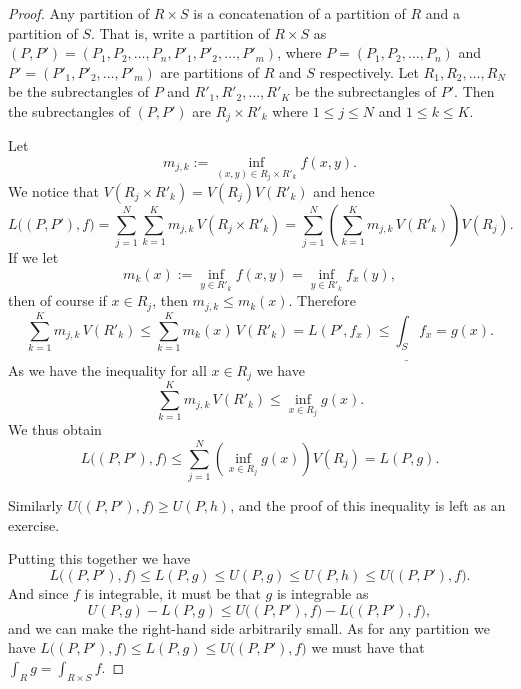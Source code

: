 \begin{proof}
Any partition of $R \times S$ is a concatenation of a partition of $R$ and a
partition of $S$.  That is, write a partition of $R \times S$
as $(P,P') = (P_1,P_2,\ldots,P_n,P'_1,P'_2,\ldots,P'_m)$,
where
$P = (P_1,P_2,\ldots,P_n)$ and
$P' = (P'_1,P'_2,\ldots,P'_m)$ are partitions of $R$ and $S$ respectively.
Let
$R_1,R_2,\ldots,R_N$ be the subrectangles of $P$ and
$R'_1,R'_2,\ldots,R'_K$ be the subrectangles of $P'$.
Then the subrectangles of $(P,P')$ are
$R_j \times R'_k$ where $1 \leq j \leq N$ and $1 \leq k \leq K$.

Let
\begin{equation*}
m_{j,k} :=
\inf_{(x,y) \in R_j \times R'_k} f(x,y) .
\end{equation*}
We notice that
$V(R_j \times R'_k) = V(R_j)V(R'_k)$ and hence
\begin{equation*}
L\bigl((P,P'),f\bigr) =
\sum_{j=1}^N
\sum_{k=1}^K
m_{j,k} \, V(R_j \times R'_k)
=
\sum_{j=1}^N
\left(
\sum_{k=1}^K
m_{j,k} \, V(R'_k) \right) V(R_j) .
\end{equation*}
If we let
\begin{equation*}
m_k(x) := \inf_{y \in R'_k} f(x,y) = \inf_{y \in R'_k} f_x(y) ,
\end{equation*}
then of course if $x \in R_j$, then $m_{j,k} \leq m_k(x)$.  Therefore
\begin{equation*}
\sum_{k=1}^K
m_{j,k} \, V(R'_k)
\leq \sum_{k=1}^K m_k(x) \, V(R'_k) = L(P',f_x) \leq
\underline{\int_S} f_x = g(x) .
\end{equation*}
As we have the inequality for all $x \in R_j$ we have
\begin{equation*}
\sum_{k=1}^K
m_{j,k} \, V(R'_k)
\leq \inf_{x \in R_j} g(x) .
\end{equation*}
We thus obtain
\begin{equation*}
L\bigl((P,P'),f\bigr) 
\leq
\sum_{j=1}^N
\left(
\inf_{x \in R_j} g(x)
\right) V(R_j) = L(P,g) .
\end{equation*}

Similarly $U\bigl((P,P'),f) \geq U(P,h)$, and the proof of this inequality is
left as an exercise.

Putting this together we have
\begin{equation*}
L\bigl((P,P'),f\bigr)
\leq
L(P,g) \leq
U(P,g) \leq
U(P,h) \leq
U\bigl((P,P'),f\bigr) .
\end{equation*}
And since $f$ is integrable, it must be that $g$ is integrable as
\begin{equation*}
U(P,g) - L(P,g)
\leq
U\bigl((P,P'),f\bigr) -
L\bigl((P,P'),f\bigr) ,
\end{equation*}
and we can make the right-hand side arbitrarily small.
As for any partition we have 
$L\bigl((P,P'),f\bigr) \leq L(P,g) \leq U\bigl((P,P'),f\bigr)$ we must have
that $\int_R g = \int_{R \times S} f$.


\end{proof}
